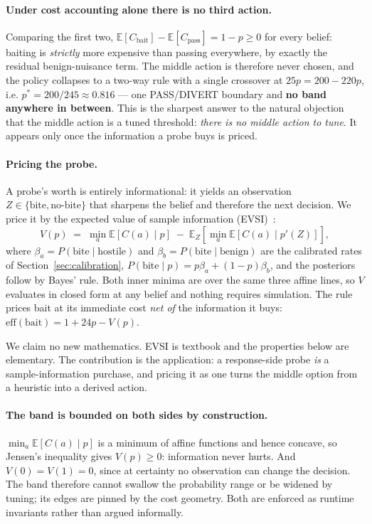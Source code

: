 \documentclass[runningheads]{llncs}
\begin{document}
\paragraph{Under cost accounting alone there is no third action.}
Comparing the first two, $\mathbb{E}[C_{\text{bait}}] - \mathbb{E}[C_{\text{pass}}]
= 1 - p \geq 0$ for every belief: baiting is \emph{strictly} more expensive than
passing everywhere, by exactly the residual benign-nuisance term. The middle action
is therefore never chosen, and the policy collapses to a two-way rule with a single
crossover at $25p = 200 - 220p$, i.e. $p^{*} = 200/245 \approx 0.816$ --- one
PASS/DIVERT boundary and \textbf{no band anywhere in between}. This is the sharpest
answer to the natural objection that the middle action is a tuned threshold:
\emph{there is no middle action to tune}. It appears only once the information a
probe buys is priced.

\paragraph{Pricing the probe.}
A probe's worth is entirely informational: it yields an observation
$Z \in \{\text{bite}, \text{no-bite}\}$ that sharpens the belief and therefore the
next decision. We price it by the expected value of sample information
(EVSI)~\cite{howard1966information}:
%
\begin{equation}
V(p) \;=\; \min_a \mathbb{E}[C(a) \mid p] \;-\; \mathbb{E}_Z\!\left[\min_a
\mathbb{E}[C(a) \mid p'(Z)]\right],
\end{equation}
%
where $\beta_a = P(\text{bite} \mid \text{hostile})$ and $\beta_b = P(\text{bite}
\mid \text{benign})$ are the calibrated rates of Section~\ref{sec:calibration},
$P(\text{bite} \mid p) = p\beta_a + (1-p)\beta_b$, and the posteriors follow by
Bayes' rule. Both inner minima are over the same three affine lines, so $V$
evaluates in closed form at any belief and nothing requires simulation. The rule
prices bait at its immediate cost \emph{net of} the information it buys:
$\text{eff}(\text{bait}) = 1 + 24p - V(p)$.

We claim no new mathematics. EVSI is textbook and the properties below are
elementary. The contribution is the application: a response-side probe \emph{is} a
sample-information purchase, and pricing it as one turns the middle option from a
heuristic into a derived action.

\paragraph{The band is bounded on both sides by construction.}
$\min_a \mathbb{E}[C(a) \mid p]$ is a minimum of affine functions and hence concave,
so Jensen's inequality gives $V(p) \geq 0$: information never hurts. And $V(0) =
V(1) = 0$, since at certainty no observation can change the decision. The band
therefore cannot swallow the probability range or be widened by tuning; its edges
are pinned by the cost geometry. Both are enforced as runtime invariants rather than
argued informally.
\end{document}
